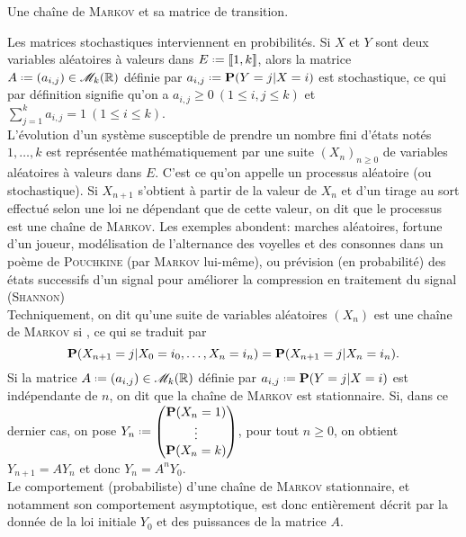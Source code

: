 
\begin{marginfigure}[3cm]
    \centering
    
    \caption*{\centering Une chaîne de \textsc{Markov} et sa matrice de transition.}
\end{marginfigure}

Les matrices stochastiques interviennent en probibilités. Si $X$ et $Y$ sont deux variables aléatoires à valeurs dans $E \defeq \llbracket 1, k \rrbracket$, alors la matrice $A \defeq (a_{i,j}) \in \M_k(\R)$ définie par $a_{i,j} \defeq \P(Y = j | X = i)$ est stochastique, ce qui par définition signifie qu'on a $a_{i,j} \geqslant 0\ (1 \leqslant i, j \leqslant k)$ et $\sum\limits_{j=1}^k a_{i,j} = 1\ (1 \leqslant i \leqslant k)$. \\
L'évolution d'un système susceptible de prendre un nombre fini d'états notés $1, \dots, k$ est représentée mathématiquement par une suite $(X_n)_{n \geqslant 0}$ de variables aléatoires à valeurs dans $E$. C'est ce qu'on appelle un processus aléatoire (ou stochastique). Si $X_{n+1}$ s'obtient à partir de la valeur de $X_n$ et d'un tirage au sort effectué selon une loi ne dépendant que de cette valeur, on dit que le processus est une chaîne de \textsc{Markov}. Les exemples abondent: marches aléatoires, fortune d'un joueur, modélisation de l'alternance des voyelles et des consonnes dans un poème de \textsc{Pouchkine} (par \textsc{Markov} lui-même), ou prévision (en probabilité) des états  successifs d'un signal pour améliorer la compression en traitement du signal (\textsc{Shannon}) \\
Techniquement, on dit qu'une suite de variables aléatoires $(X_n)$ est une chaîne de \textsc{Markov} si , ce qui se traduit par
$$\P(X_{n+1}=j | X_0=i_0, \dots, X_n = i_n) = \P(X_{n+1} = j | X_n = i_n).$$
Si la matrice $A \defeq (a_{i,j}) \in \M_k(\R)$ définie par $a_{i,j} \defeq \P(Y = j | X = i)$ est indépendante de $n$, on dit que la chaîne de \textsc{Markov} est stationnaire. Si, dans ce dernier cas, on pose $Y_n \defeq \begin{pmatrix} \P(X_n = 1) \\ \vdots \\ \P(X_n = k) \end{pmatrix}$, pour tout $n \geqslant 0$, on obtient $Y_{n+1} = A Y_n$ et donc $Y_n = A^n Y_0$. \\
Le comportement (probabiliste) d'une chaîne de \textsc{Markov} stationnaire, et notamment son comportement asymptotique, est donc entièrement décrit par la donnée de la loi initiale $Y_0$ et des puissances de la matrice $A$. 

